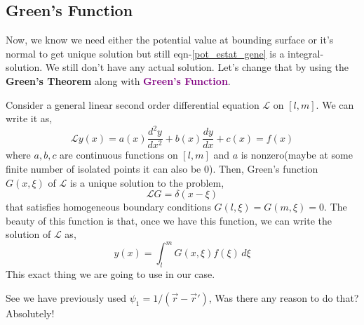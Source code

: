\documentclass{article}
\begin{document}
\subsection{Green's Function}
Now, we know we need either the potential value at bounding surface or it's normal to get unique solution but still eqn-\ref{pot_estat_gene} is a integral-solution. We still don't have any actual solution. Let's change that by using the \textbf{Green's Theorem} along with \textcolor{purple}{\textbf{Green's Function}}.
\begin{note}
    Consider a general linear second order differential equation $\mathcal{L}$ on $[l,m]$. We can write it as,
    \begin{equation*}
        \mathcal{L}y(x) = a(x)\frac{d^2y}{dx^2} + b(x) \frac{dy}{dx} + c(x) = f(x)
    \end{equation*}
    where $a,b,c$ are continuous functions on $[l,m]$ and $a$ is nonzero(maybe at some finite number of isolated points it can also be $0$). Then, Green's function $G(x,\xi)$ of $\mathcal{L}$ is a unique solution to the problem,
    \begin{equation*}
        \mathcal{L}G=\delta(x-\xi)
    \end{equation*}
    that satisfies homogeneous boundary conditions $G(l,\xi)=G(m,\xi)=0$. The beauty of this function is that, once we have this function, we can write the solution of $\mathcal{L}$ as,
    \begin{equation*}
        y(x) = \int_l^m G(x,\xi) f(\xi)\, d\xi
    \end{equation*}
    This exact thing we are going to use in our case.
\end{note}
See we have previously used $\psi_1=1/(\vec{r}-\vec{r}')$, Was there any reason to do that? Absolutely!
\end{document}
